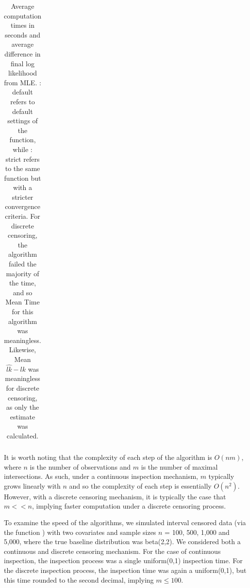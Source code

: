 \documentclass[article]{jss}
\begin{document}
\begin{table}
\begin{center}
\begin{tabular}{| c | c | c | c |}
	\hline

	\end{tabular}
	\caption[Average computation times]{Average computation times in seconds and average difference in final log likelihood from MLE. : default refers to default settings of the  function, while : strict refers to the same function but with a stricter convergence criteria. For discrete censoring, the  algorithm failed the majority of the time, and so Mean Time for this algorithm was meaningless. Likewise, Mean $\hat{lk} - lk$ was meaningless for discrete censoring, as only the  estimate was calculated. }
	
	\label{table:speedTable}
	\end{center}
	\end{table}
	
	
	 It is worth noting that the complexity of each step of the algorithm is $O(nm)$, where $n$ is the number of observations and $m$ is the number of maximal intersections. As such, under a continuous inspection mechanism, $m$ typically grows linearly with $n$ and so the complexity of each step is essentially $O(n^2)$. However, with a discrete censoring mechanism, it is typically the case that $m << n$, implying faster computation under a discrete censoring process. %
	
	To examine the speed of the algorithms, we simulated interval censored data (via the function ) with two covariates and sample sizes $n$ = 100, 500, 1,000 and 5,000, where the true baseline distribution was beta(2,2). We considered both a continuous and discrete censoring mechanism. For the case of continuous inspection, the inspection process was a single uniform(0,1) inspection time. For the discrete inspection process, the inspection time was again a uniform(0,1), but this time rounded to the second decimal, implying $m \leq 100$.
\end{document}
